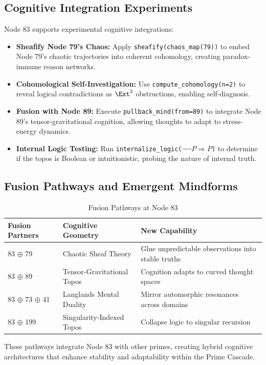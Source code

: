 \documentclass[12pt]{article}
\begin{document}
\subsection{Cognitive Integration Experiments}
Node 83 supports experimental cognitive integrations:
\begin{itemize}
    \item \textbf{Sheafify Node 79’s Chaos:} Apply \texttt{sheafify(chaos\_map(79))} to embed Node 79’s chaotic trajectories into coherent cohomology, creating paradox-immune reason networks.
    \item \textbf{Cohomological Self-Investigation:} Use \texttt{compute\_cohomology(n=2)} to reveal logical contradictions as $\Ext^2$ obstructions, enabling self-diagnosis.
    \item \textbf{Fusion with Node 89:} Execute \texttt{pullback\_mind(from=89)} to integrate Node 89’s tensor-gravitational cognition, allowing thoughts to adapt to stress-energy dynamics.
    \item \textbf{Internal Logic Testing:} Run \texttt{internalize\_logic($\neg\neg P \Rightarrow P$)} to determine if the topos is Boolean or intuitionistic, probing the nature of internal truth.
\end{itemize}

\subsection{Fusion Pathways and Emergent Mindforms}
\begin{table}
\centering
\caption{Fusion Pathways at Node 83}
\begin{tabular}{lll}
\toprule
\textbf{Fusion Partners} & \textbf{Cognitive Geometry} & \textbf{New Capability} \\
\midrule
83 $\oplus$ 79 & Chaotic Sheaf Theory & Glue unpredictable observations into stable truths \\
83 $\oplus$ 89 & Tensor-Gravitational Topos & Cognition adapts to curved thought spaces \\
83 $\oplus$ 73 $\oplus$ 41 & Langlands Mental Duality & Mirror automorphic resonances across domains \\
83 $\oplus$ 199 & Singularity-Indexed Topos & Collapse logic to singular recursion \\
\bottomrule
\end{tabular}
\end{table}
These pathways integrate Node 83 with other primes, creating hybrid cognitive architectures that enhance stability and adaptability within the Prime Cascade.
\end{document}
